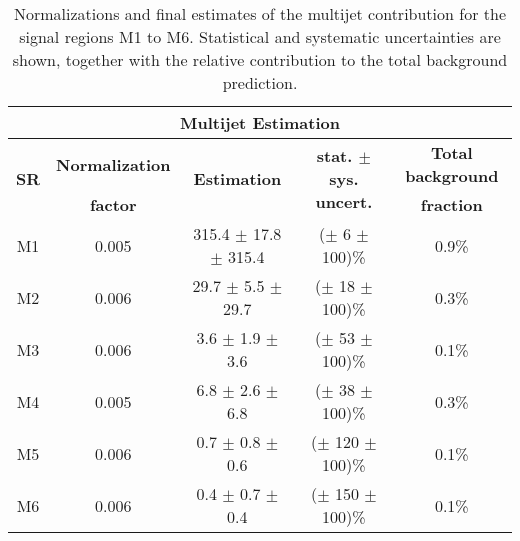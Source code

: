 \begin{sidewaystable}[!htb]
\begin{center}
\vspace*{1em}
\begin{tabular}{ccccc}
\hline\hline
\multicolumn{5}{c}{\textbf{Multijet Estimation}} \\
\hline
\multirow{2}{*}{\textbf{SR}}  & \textbf{Normalization} & \multirow{2}{*}{\textbf{Estimation}}    & \multirow{2}{*}{\textbf{stat. $\pm$ sys. uncert.}} & \textbf{Total background}  \\
                              & \textbf{factor}        &                                         &                                   & \textbf{fraction} \\
\hline
M1  & 0.005 & \phantom{1}315.4 $\pm$           17.8 $\pm$ 315.4 &    ($\pm$ \phantom{11}6 $\pm$ 100)\%   & 0.9\%   \\
M2  & 0.006 & \phantom{11}29.7 $\pm$ \phantom{1}5.5 $\pm$ 29.7 &    ($\pm$ \phantom{1}18 $\pm$ 100)\%   & 0.3\%   \\
M3  & 0.006 & \phantom{111}3.6 $\pm$ \phantom{1}1.9 $\pm$ 3.6 &    ($\pm$ \phantom{1}53 $\pm$ 100)\%   & 0.1\%    \\
M4  & 0.005 & \phantom{111}6.8 $\pm$ \phantom{1}2.6 $\pm$ 6.8 &    ($\pm$ \phantom{1}38 $\pm$ 100)\%   & 0.3\%    \\
M5  & 0.006 & \phantom{111}0.7 $\pm$ \phantom{1}0.8 $\pm$ 0.6 &    ($\pm$           120 $\pm$ 100)\%   & 0.1\%    \\
M6  & 0.006 & \phantom{111}0.4 $\pm$ \phantom{1}0.7 $\pm$ 0.4 &    ($\pm$           150 $\pm$ 100)\%   & 0.1\%    \\
\hline\hline
\end{tabular}
\end{center}
\caption[Normalizations and final estimates of the multijet contribution for the signal regions M1 to M6.]
{Normalizations and final estimates of the multijet contribution for the signal regions M1 to M6. Statistical and systematic uncertainties are shown, together with the relative contribution to the total background prediction.}
\label{tab:qcd_est}
\end{sidewaystable} 
